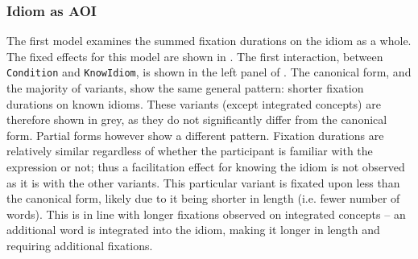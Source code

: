 \documentclass[output=paper
,modfonts
,nonflat]{langsci/langscibook}
\begin{document}
\subsubsection{Idiom as AOI}

The first model examines the summed fixation durations on the idiom as a whole. The fixed effects for this model are shown in . The first interaction, between \texttt{Condition} and \texttt{KnowIdiom}, is shown in the left panel of . The canonical form, and the majority of variants, show the same general pattern: shorter fixation durations on known idioms. These variants (except integrated concepts) are therefore shown in grey, as they do not significantly differ from the canonical form. Partial forms however show a different pattern. Fixation durations are relatively similar regardless of whether the participant is familiar with the expression or not; thus a facilitation effect for knowing the idiom is not observed as it is with the other variants. This particular variant is fixated upon less than the canonical form, likely due to it being shorter in length (i.e. fewer number of words). This is in line with longer fixations observed on integrated concepts -- an additional word is integrated into the idiom, making it longer in length and requiring additional fixations.
\end{document}

